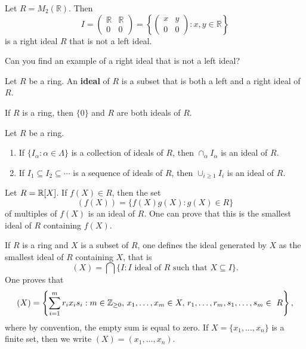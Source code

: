 \begin{example}
Let $R=M_{2}(\mathbb{R})$. Then   
\[
I=\left(\begin{array}{cc}
\mathbb{R} & \mathbb{R}\\
0 & 0
\end{array}\right)=\left\{ \left(\begin{array}{cc}
x & y\\
0 & 0
\end{array}\right):x,y\in\mathbb{R}\right\} 
\]
is a right ideal $R$ that is not a left ideal. 
\end{example}

Can you find an 
example of a right ideal that is not a left ideal?

\begin{definition}
Let $R$ be a ring. An \textbf{ideal} of $R$ 
is a subset that is both a left and a right ideal of $R$. 
\end{definition}
 
If $R$ is a ring, then $\{0\}$ and $R$ are both ideals of $R$. 

\begin{exercise}
Let $R$ be a ring. 
\begin{enumerate}
\item If $\{I_\alpha:\alpha\in\Lambda\}$ is a collection of ideals of $R$, then $\cap_{\alpha}I_\alpha$ is an ideal of $R$.  	
\item If $I_1\subseteq I_2\subseteq\cdots$ is a sequence of ideals of $R$, then $\cup_{i\geq1}I_i$ is an ideal of $R$. 
\end{enumerate}
\end{exercise}


\begin{example}
Let $R=\mathbb{R}[X]$. If $f(X)\in R$, then the set 
\[
(f(X))=\{f(X)g(X):g(X)\in R\}
\]
of multiples of $f(X)$ is an ideal of $R$. One can prove that this is the smallest 
ideal of $R$ containing $f(X)$.  	
\end{example}

If $R$ is a ring and $X$ is a subset of $R$, one defines
the ideal generated by $X$ as the smallest ideal of $R$ containing $X$, that is 
\[
(X)=\bigcap\{I:\text{$I$ ideal of $R$ such that $X\subseteq I$}\}.
\]
One proves that 
\[
(X)=\left\{\sum_{i=1}^mr_ix_is_i:m\in\Z_{\geq0},\,x_1,\dots,x_m\in X,\,r_1,\dots,r_m,s_1,\dots,s_m\in R\right\}, 
\]
where by convention, the empty sum is equal to zero. If $X=\{x_1,\dots,x_n\}$ is a finite
set, then we write $(X)=(x_1,\dots,x_n)$. 

